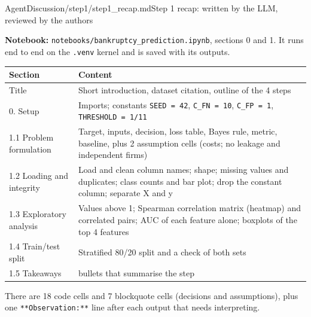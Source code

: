 \begin{mdfile}{AgentDiscussion/\allowbreak{}step1/\allowbreak{}step1\_recap.md}{Step 1 recap: written by the LLM, reviewed by the authors}

\textbf{Notebook:} \texttt{notebooks/bankruptcy\_prediction.ipynb}, sections 0 and 1. It runs end to end on the \texttt{.venv} kernel and is saved with its outputs.


{\def\LTcaptype{none} %
\begin{tabularx}{\linewidth}{@{}l>{\raggedright\arraybackslash}X@{}}
\toprule\noalign{}
Section & Content \\
\midrule\noalign{}
Title & Short introduction, dataset citation, outline of the 4 steps \\
0. Setup & Imports; constants \texttt{SEED\ =\ 42}, \texttt{C\_FN\ =\ 10}, \texttt{C\_FP\ =\ 1}, \texttt{THRESHOLD\ =\ 1/11} \\
1.1 Problem formulation & Target, inputs, decision, loss table, Bayes rule, metric, baseline, plus 2 assumption cells (costs; no leakage and independent firms) \\
1.2 Loading and integrity & Load and clean column names; shape; missing values and duplicates; class counts and bar plot; drop the constant column; separate X and y \\
1.3 Exploratory analysis & Values above 1; Spearman correlation matrix (heatmap) and correlated pairs; AUC of each feature alone; boxplots of the top 4 features \\
1.4 Train/test split & Stratified 80/20 split and a check of both sets \\
1.5 Takeaways & 5 bullets that summarise the step \\
\bottomrule
\end{tabularx}
}

There are 18 code cells and 7 blockquote cells (decisions and assumptions), plus one \texttt{**Observation:**} line after each output that needs interpreting.



\end{mdfile}
